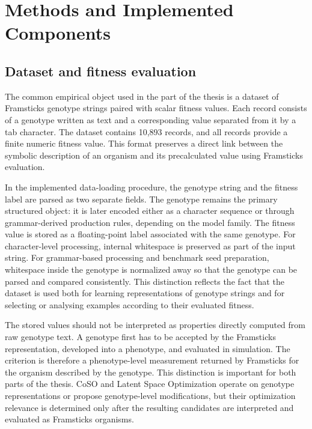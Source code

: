 \chapter{Methods and Implemented Components}

\section{Dataset and fitness evaluation}
\label{sec:Dataset and fitness evaluation}

The common empirical object used in the \fone{} part of the thesis is a dataset of Framsticks \fone{} genotype strings paired with scalar fitness values. Each record consists of a genotype written as text and a corresponding \vertpos{} value separated from it by a tab character. The dataset contains 10,893 records, and all records provide a finite numeric fitness value. This format preserves a direct link between the symbolic description of an organism and its precalculated value using Framsticks evaluation.

In the implemented data-loading procedure, the genotype string and the fitness label are parsed as two separate fields. The genotype remains the primary structured object: it is later encoded either as a character sequence or through grammar-derived production rules, depending on the model family. The fitness value is stored as a floating-point label associated with the same genotype. For character-level processing, internal whitespace is preserved as part of the input string. For grammar-based processing and benchmark seed preparation, whitespace inside the genotype is normalized away so that the genotype can be parsed and compared consistently. This distinction reflects the fact that the dataset is used both for learning representations of genotype strings and for selecting or analysing examples according to their evaluated fitness.

The stored \vertpos{} values should not be interpreted as properties directly computed from raw genotype text. A genotype first has to be accepted by the Framsticks representation, developed into a phenotype, and evaluated in simulation. The \vertpos{} criterion is therefore a phenotype-level measurement returned by Framsticks for the organism described by the genotype. This distinction is important for both parts of the thesis. CoSO and Latent Space Optimization operate on genotype representations or propose genotype-level modifications, but their optimization relevance is determined only after the resulting candidates are interpreted and evaluated as Framsticks organisms.

